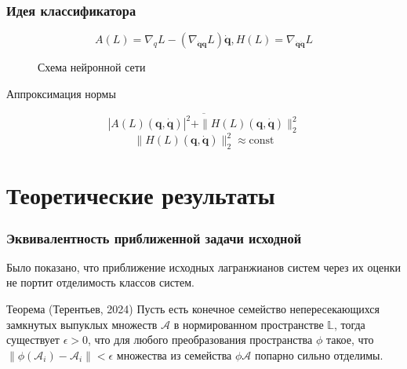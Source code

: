 \documentclass{beamer}
\begin{document}
\begin{frame}
\frametitle{Идея классификатора}
$$A(L) = \nabla_{q} L-\left(\nabla_{\dot{\mathbf{q}}\mathbf{q}} L\right) \dot{\mathbf{q}}, H(L) = \nabla_{\dot{\mathbf{q}} \dot{\mathbf{q}}} L$$

\begin{figure}
\centering
{}
\caption{Схема нейронной сети}
\label{fig: LNN}
\end{figure}
\begin{block}{Аппроксимация нормы}

$$\overline{|A(L)\left(\mathbf{q}, \dot{\mathbf{q}}\right)|^2 + \|H(L)\left(\mathbf{q}, \dot{\mathbf{q}}\right)\|_2^2}$$
$$\|H(L)\left(\mathbf{q}, \dot{\mathbf{q}}\right)\|_2^2 \approx \text{const}$$
\end{block}

\end{frame}

\section{Теоретические результаты}

\begin{frame}
\frametitle{Эквивалентность приближенной задачи исходной}
Было показано, что приближение исходных лагранжианов систем через их оценки не портит отделимость классов систем.
\begin{block} {Теорема (Терентьев, 2024)}
Пусть есть конечное семейство непересекающихся замкнутых выпуклых множеств $\mathcal{A}$ в нормированном пространстве $\mathbb{L}$, тогда существует $\epsilon > 0$, что для любого преобразования пространства $\phi$ такое, что $\|\phi(\mathcal{A}_{i}) - \mathcal{A}_{i}\| < \epsilon$ множества из семейства $\phi{\mathcal{A}}$ попарно сильно отделимы.
\end{block} 
\end{frame}
\end{document}
